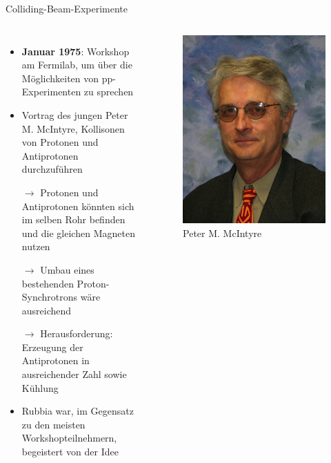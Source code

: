 \documentclass[aspectratio=1610, professionalfonts, 10pt]{beamer}
\begin{document}
\begin{frame}{Colliding-Beam-Experimente}
	\begin{columns}
				\begin{itemize}
					\setlength\itemsep{0.5em}
					\item \textbf{Januar 1975}: Workshop am Fermilab, um über die Möglichkeiten von pp-Experimenten zu sprechen
					\item Vortrag des jungen Peter M. McIntyre, Kollisonen von Protonen und Antiprotonen durchzuführen
					\item[$\rightarrow$] Protonen und Antiprotonen könnten sich im selben Rohr befinden und die gleichen Magneten nutzen
					\item[$\rightarrow$] Umbau eines bestehenden Proton-Synchrotrons wäre ausreichend
					\item[$\rightarrow$] Herausforderung: Erzeugung der Antiprotonen in ausreichender Zahl sowie Kühlung
					\item Rubbia war, im Gegensatz zu den meisten Workshopteilnehmern, begeistert von der Idee
				\end{itemize}
			\begin{figure}
	  			\centering
				\includegraphics[width=0.8\linewidth]{Images/mcintyre.jpg}
				\caption{Peter M. McIntyre \cite{mci}}
	  			\label{fig:sad}
			\end{figure}

	\end{columns}
\end{frame}
\end{document}
